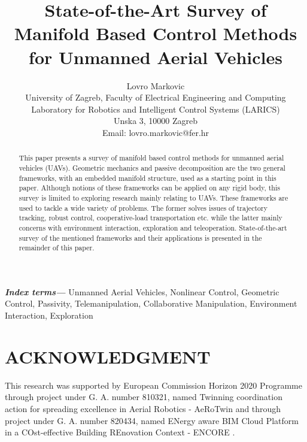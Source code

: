 \documentclass[letterpaper, 10 pt, conference]{ieeeconf}  %
\title{\LARGE \bf
State-of-the-Art Survey of Manifold Based Control Methods for Unmanned Aerial Vehicles
}
\author{Lovro Markovic \\
	University of Zagreb, Faculty of Electrical Engineering and Computing \\
	Laboratory for Robotics and Intelligent Control Systems (LARICS) \\
	Unska 3, 10000 Zagreb \\
	Email: lovro.markovic@fer.hr
}
\providecommand{\indexterms}[1]{\textbf{\textit{Index terms---}} #1}
\begin{document}
\maketitle

\thispagestyle{empty}
\pagestyle{empty}


\begin{abstract}
This paper presents a survey of manifold based control methods for unmanned aerial vehicles (UAVs). 
Geometric mechanics and passive decomposition are the two general frameworks, with an embedded manifold structure, used as a starting point in this paper. Although notions of these frameworks can be applied on any rigid body, this survey is limited to exploring research mainly relating to UAVs. These frameworks are used to tackle a wide variety of problems. The former solves issues of trajectory tracking, robust control, cooperative-load transportation etc. while the latter mainly concerns with environment interaction, exploration and teleoperation. State-of-the-art survey of the mentioned frameworks and their applications is presented in the remainder of this paper.
\end{abstract}

\indexterms{Unmanned Aerial Vehicles, Nonlinear Control, Geometric Control, Passivity, Telemanipulation, Collaborative Manipulation, Environment Interaction, Exploration}





%


\section*{ACKNOWLEDGMENT}

This research was supported by European Commission Horizon 2020 Programme through project under G. A. number 810321, named Twinning coordination action for spreading excellence in Aerial Robotics - AeRoTwin \cite{AEROTWINweb} and through project under G. A. number 820434, named ENergy aware BIM Cloud Platform in a COst-effective Building REnovation Context - ENCORE \cite{ENCOREweb}.



\end{document}

